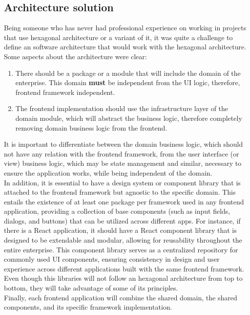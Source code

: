\documentclass[../design.tex]{subfiles}
\begin{document}
\subsection{Architecture solution}
Being someone who has never had professional experience on working in projects
that use hexagonal architecture or a variant of it, it was quite a challenge to
define an software architecture that would work with the hexagonal architecture.
Some aspects about the architecture were clear:
\begin{enumerate}
	\item There should be a package or a module that will include the domain of
	      the enterprise. This domain \textbf{must} be independent from the UI logic,
	      therefore, frontend framework independent.
	\item The frontend implementation should use the infrastructure layer of the
	      domain module, which will abstract the business logic, therefore completely
	      removing domain business logic from the frontend.
\end{enumerate}
It is important to differentiate between the domain business logic, which should
not have any relation with the frontend framework, from the user interface (or
view) business logic, which may be state management and similar, necessary to
ensure the application works, while being independent of the domain.
\\[8pt]
In addition, it is essential to have a design system or component library that
is attached to the frontend framework but agnostic to the specific domain. This
entails the existence of at least one package per framework used in any frontend
application, providing a collection of base components (such as input fields,
dialogs, and buttons) that can be utilized across different apps. For instance,
if there is a React application, it should have a React component library that
is designed to be extendable and modular, allowing for reusability throughout
the entire enterprise. This component library serves as a centralized repository
for commonly used UI components, ensuring consistency in design and user
experience across different applications built with the same frontend framework.
\\
Even though this libraries will not follow an hexagonal architecture from top to
bottom, they will take advantage of some of its principles.
\\[8pt]
Finally, each frontend application will combine the shared domain, the shared
components, and its specific framework implementation.
\end{document}
